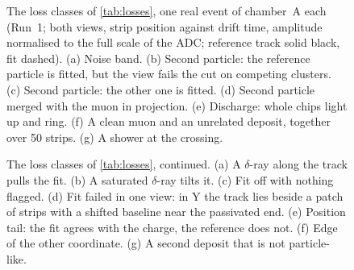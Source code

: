 \begin{figure}[p]
  \centering
  \caption{The loss classes of \cref{tab:losses}, one real event of chamber~A each (Run~1; both views, strip position
  against drift time, amplitude normalised to the full scale of the ADC; reference track solid black, fit dashed).
  (a) Noise band. (b) Second particle: the reference particle is fitted, but the view fails the cut on competing
  clusters. (c) Second particle: the other one is fitted. (d) Second particle merged with the muon in projection. (e)
  Discharge: whole chips light up and ring. (f) A clean muon and an unrelated deposit, together over 50 strips. (g) A
  shower at the crossing.}
  \label{fig:gallery1}
\end{figure}
\begin{figure}[p]
  \centering
  \caption{The loss classes of \cref{tab:losses}, continued. (a) A $\delta$-ray along the track pulls the fit. (b) A
  saturated $\delta$-ray tilts it. (c) Fit off with nothing flagged. (d) Fit failed in one view: in Y the track lies
  beside a patch of strips with a shifted baseline near the passivated end. (e) Position tail: the fit agrees with the
  charge, the reference does not. (f) Edge of the other coordinate. (g) A second deposit that is not particle-like.}
  \label{fig:gallery2}
\end{figure}
